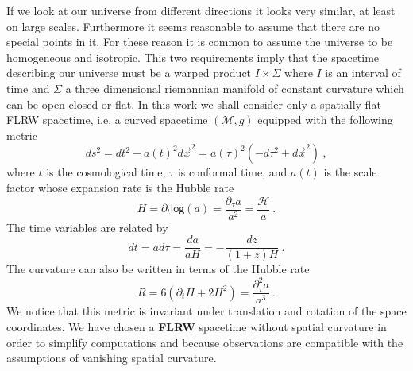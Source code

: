 \documentclass[11pt]{book}
\renewcommand{\log}{\mathsf{log}}
\newcommand{\Hcal}{\mathcal{H}}
\newcommand{\Mcal}{\mathcal{M}}
\theoremstyle{break}
\begin{document}
If we look at our universe from different directions it looks very similar, at least on large scales. Furthermore it seems reasonable to assume that there are no special points in it. For these reason it is common to assume the universe to be homogeneous and isotropic. This two requirements imply that the spacetime describing our universe must be a warped product $I\times \Sigma$ where $I$ is an interval of time and $\Sigma$ a three dimensional riemannian manifold of constant curvature which can be open closed or flat. In this work we shall consider only a spatially flat FLRW spacetime, i.e. a curved spacetime $(\Mcal,g)$ equipped with the following metric
%
\begin{equation*}
ds^2 = dt^2 - a(t)^2 d\vec{x}^2 = a(\tau)^2\left(-d\tau^2+d\vec{x}^2\right) \ ,
\end{equation*}
%
where $t$ is the cosmological time, $\tau$ is conformal time, and $a(t)$ is the scale factor whose expansion rate is the Hubble rate
%
\begin{equation*}
H = \partial_t \log (a) = \frac{\partial_\tau a}{a^2} = \frac{\Hcal}{a} \ .
\end{equation*}
%
The time variables are related by
%
\begin{equation*}
dt = a d\tau = \frac{da}{aH} = -\frac{dz}{(1+z)H} \ . 
\end{equation*}
% 
The curvature can also be written in terms of the Hubble rate
%
\begin{equation}
R=6(\partial_t H + 2 H^2)=\frac{\partial^2_\tau a}{a^3} \ . 
\label{eq:rflrw}
\end{equation}
%
We notice that this metric is invariant under translation and rotation of the space coordinates. We have chosen a \textbf{FLRW} spacetime without spatial curvature in order to simplify computations and because observations are compatible with the assumptions of vanishing spatial curvature. 


\nocite{*}




\end{document}
